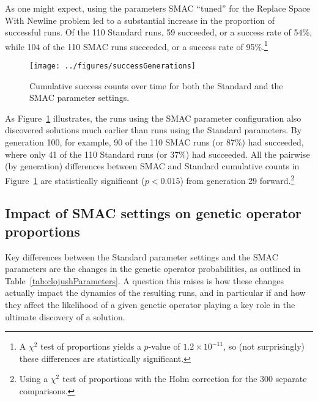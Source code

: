 As one might expect, using the parameters SMAC ``tuned'' for the
Replace Space With Newline problem led to a 
substantial increase in the proportion of successful runs. Of the 110
Standard runs, 59  succeeded, or a success rate of 54\%, while 104 of the
110 SMAC runs succeeded, or a success rate of 95\%.\footnote{A $\chi^2$ test of 
proportions yields a $p$-value of $1.2 \times 10^{-11}$, so (not surprisingly)
these differences are statistically significant.}

\begin{figure}
	\texttt{[image: ../figures/successGenerations]}
	\caption{Cumulative success counts over time for both the Standard
	and the SMAC parameter settings.}
	\label{fig:successGenerations}
\end{figure}

As Figure~\ref{fig:successGenerations} illustrates, the runs using the SMAC
parameter configuration also discovered solutions much earlier than runs using
the Standard parameters. By generation 100, for example, 90 of the 110 SMAC 
runs (or 87\%) had succeeded, where only 41 of the 110 Standard runs 
(or 37\%) had succeeded. All the pairwise (by generation) differences 
between SMAC and Standard cumulative counts in 
Figure~\ref{fig:successGenerations} are 
statistically significant ($p<0.015$)
from generation 29 forward.\footnote{Using a $\chi^2$ test of proportions 
	with the Holm correction for the 300 separate comparisons.}

\subsection{Impact of SMAC settings on genetic operator proportions}
\label{sec:SMACimpactRSWNops}

Key differences between the Standard parameter settings and the SMAC parameters
are the changes in the genetic operator probabilities, as outlined in
Table~\ref{tab:clojushParameters}. 
A question this raises is how these changes
actually impact the dynamics of the resulting runs, and in particular if and
how they affect the likelihood of a given genetic operator playing a key
role in the ultimate discovery of a solution.


